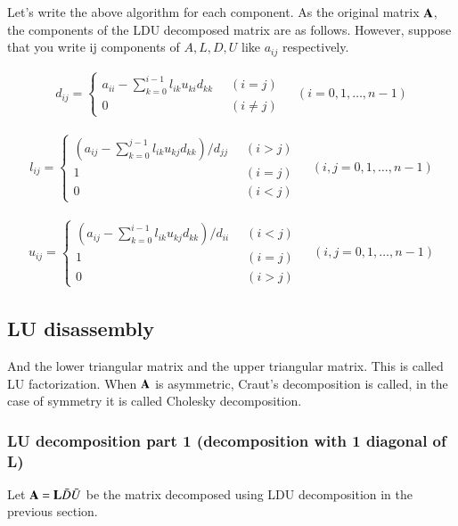 Let's write the above algorithm for each component. As the original matrix $\mathbf{A}$, the components of the LDU decomposed matrix are as follows.
However, suppose that you write ij components of $A,L,D,U$ like $a_{ij}$ respectively.

\begin{eqnarray}
d_{ij} =
\left\{\begin{array}{ll}
a_{ii} - \sum_{k=0}^{i-1}l_{ik} u_{ki} d_{kk}\;\; & (i=j)\\
0 & (i\ne j)
\end{array}\right.\;\;\;\; (i=0,1,\ldots,n-1)
\end{eqnarray}


\begin{eqnarray}
l_{ij} =
\left\{\begin{array}{ll}
\left(a_{ij} - \sum_{k=0}^{j-1} l_{ik} u_{kj} d_{kk}\right)/d_{jj}\;\; &  (i>j)\\ 1 &(i=j)\\
0 & (i<j)\end{array}\right.\;\;\;\; (i,j=0,1,\ldots,n-1)
\end{eqnarray}


\begin{eqnarray}
u_{ij} = \left\{\begin{array}{ll}
\left(a_{ij} - \sum_{k=0}^{i-1} l_{ik} u_{kj} d_{kk}\right)/d_{ii}\;\; & (i<j)\\
1 & (i=j)\\ 0 & (i>j)\end{array}\right.\;\;\;\; (i,j=0,1,\ldots,n-1)
\end{eqnarray}


\subsection{LU disassembly}

And the lower triangular matrix and the upper triangular matrix. This is called LU factorization. When $\mathbf{A}$ is asymmetric, Craut's decomposition is called, in the case of symmetry it is called Cholesky decomposition.

\subsubsection{LU decomposition part 1 (decomposition with 1 diagonal of L)}

Let $\mathbf{A}=\mathbf{L}\bar{D}\bar{U}$ be the matrix decomposed using LDU decomposition in the previous section.

